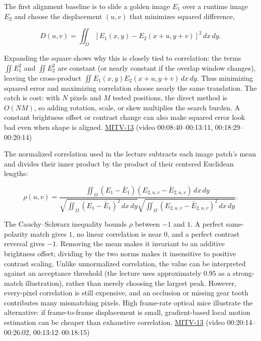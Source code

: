 The first alignment baseline is to slide a golden image \(E_1\) over a runtime image \(E_2\) and choose the displacement \((u,v)\) that minimizes squared difference,

\[
D(u,v)=\iint_\Omega [E_1(x,y)-E_2(x+u,y+v)]^2\,dx\,dy.
\]

Expanding the square shows why this is closely tied to correlation: the terms \(\iint E_1^2\) and \(\iint E_2^2\) are constant (or nearly constant if the overlap window changes), leaving the cross-product \(\iint E_1(x,y)E_2(x+u,y+v)\,dx\,dy\). Thus minimizing squared error and maximizing correlation choose nearly the same translation. The catch is cost: with \(N\) pixels and \(M\) tested positions, the direct method is \(O(NM)\), so adding rotation, scale, or skew multiplies the search burden. A constant brightness offset or contrast change can also make squared error look bad even when shape is aligned. \hyperref[04-visual-computing-ii-ch036-mitv-13---object-detection-recognition-and-pose-determination-patquick-us-7016539]{MITV-13} (video 00:08:40--00:13:11, 00:18:29--00:20:14)

The normalized correlation used in the lecture subtracts each image patch's mean and divides their inner product by the product of their centered Euclidean lengths:

\[
\rho(u,v)=\frac{\iint_\Omega (E_1-\bar E_1)(E_{2,u,v}-\bar E_{2,u,v})\,dx\,dy}{\sqrt{\iint_\Omega(E_1-\bar E_1)^2\,dx\,dy}\sqrt{\iint_\Omega(E_{2,u,v}-\bar E_{2,u,v})^2\,dx\,dy}}.
\]

The Cauchy--Schwarz inequality bounds \(\rho\) between \(-1\) and \(1\). A perfect same-polarity match gives \(1\), no linear correlation is near \(0\), and a perfect contrast reversal gives \(-1\). Removing the mean makes it invariant to an additive brightness offset; dividing by the two norms makes it insensitive to positive contrast scaling. Unlike unnormalized correlation, the value can be interpreted against an acceptance threshold (the lecture uses approximately \(0.95\) as a strong-match illustration), rather than merely choosing the largest peak. However, every-pixel correlation is still expensive, and an occlusion or missing gear tooth contributes many mismatching pixels. High frame-rate optical mice illustrate the alternative: if frame-to-frame displacement is small, gradient-based local motion estimation can be cheaper than exhaustive correlation. \hyperref[04-visual-computing-ii-ch036-mitv-13---object-detection-recognition-and-pose-determination-patquick-us-7016539]{MITV-13} (video 00:20:14--00:26:02, 00:13:12--00:18:15)

